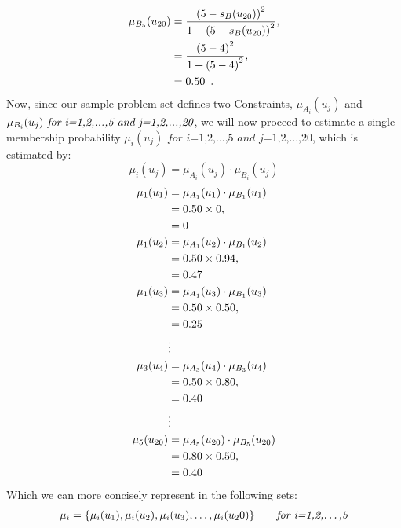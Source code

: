 \documentclass[a4paper,openany]{book}
\begin{document}
				\begin{align}
					\mu_{B_5}(u_{20}) &= \frac{\left(5-s_B(u_{20})\right)^2}{1 + \left(5-s_B(u_{20})\right)^2} ,\\
					&= \frac{\left(5-4\right)^2}{1 + \left(5-4\right)^2} \notag ,\\
					&= 0.50 \enspace. \notag
				\end{align}
			\newpage
				Now, since our sample problem set defines two Constraints, $\mu_{A_i}(u_j)$ and $\mu_{B_i}(u_j) \\
				 \textit{ for i=1,2,...,5 and j=1,2,...,20}$, we will now proceed to estimate a single membership probability $\mu_i(u_j)  \textit{ for i=1,2,...,5 and j=1,2,...,20}$, which is estimated by:
				\begin{equation}
					\mu_i(u_j) = \mu_{A_i}(u_j) \cdot \mu_{B_i}(u_j)
				\end{equation}
				\begin{align}
					\mu_1(u_1) &= \mu_{A_1}(u_1) \cdot \mu_{B_1}(u_1) \\
					&= 0.50 \times 0 \notag ,\\
					&= 0 \notag\\
					\mu_1(u_2) &= \mu_{A_1}(u_2) \cdot \mu_{B_1}(u_2) \\
					&= 0.50 \times 0.94 \notag ,\\
					&= 0.47 \notag\\
					\mu_1(u_3) &= \mu_{A_1}(u_3) \cdot \mu_{B_1}(u_3) \\
					&= 0.50 \times 0.50 \notag ,\\
					&= 0.25 \notag\\
					&\vdots \notag \\
					\mu_3(u_4) &= \mu_{A_3}(u_4) \cdot \mu_{B_3}(u_4) \\
					&= 0.50 \times 0.80 \notag ,\\
					&= 0.40 \notag\\
					&\vdots \notag \\
					\mu_5(u_{20}) &= \mu_{A_5}(u_{20}) \cdot \mu_{B_5}(u_{20}) \\
					&= 0.80 \times 0.50 \notag ,\\
					&= 0.40 \notag\\
				\end{align}
				Which we can more concisely represent in the following sets:
				\begin{align}
					\mu_i = \{ \mu_i(u_1), \mu_i(u_2), \mu_i(u_3),\dots,\mu_i(u_20) \} \qquad \textit{for i=1,2,\dots,5}
				\end{align}
\end{document}
